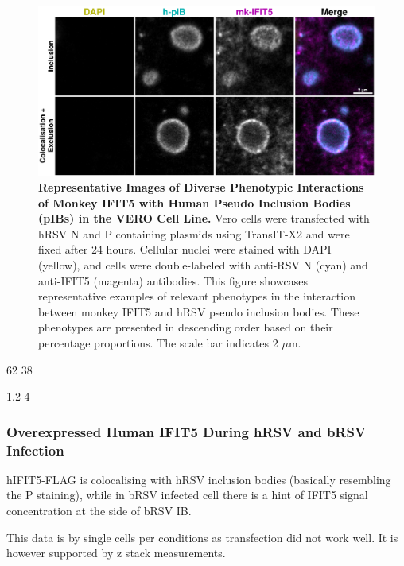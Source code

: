 \begin{figure}
    \centering
    \includegraphics[width=1\linewidth]{09. Chapter 4/Figs/01. pIB/05. IFIT5/03. i5-vero-hnhp.pdf}
    \caption[Representative Images of Diverse Phenotypic Interactions of Monkey IFIT5 with Human Pseudo Inclusion Bodies (pIBs) in the VERO Cell Line.]{\textbf{Representative Images of Diverse Phenotypic Interactions of Monkey IFIT5 with Human Pseudo Inclusion Bodies (pIBs) in the VERO Cell Line.} Vero cells were transfected with hRSV N and P containing plasmids using TransIT-X2 and were fixed after 24 hours. Cellular nuclei were stained with DAPI (yellow), and cells were double-labeled with anti-RSV N (cyan) and anti-IFIT5 (magenta) antibodies. This figure showcases representative examples of relevant phenotypes in the interaction between monkey IFIT5 and hRSV pseudo inclusion bodies. These phenotypes are presented in descending order based on their percentage proportions. The scale bar indicates 2 \(\mu \mbox{m}\).}
    \label{fig:Representative Images of Diverse Phenotypic Interactions of Monkey IFIT5 with Human Pseudo Inclusion Bodies (pIBs) in the VERO Cell Line}
\end{figure}

62 38

1.2 4

\subsubsection{Overexpressed Human IFIT5 During hRSV and bRSV Infection}
hIFIT5-FLAG is colocalising with hRSV inclusion bodies (basically resembling the P staining), while in bRSV infected cell there is a hint of IFIT5 signal concentration at the side of bRSV IB.

This data is by single cells per conditions as transfection did not work well. It is however supported by z stack measurements.

